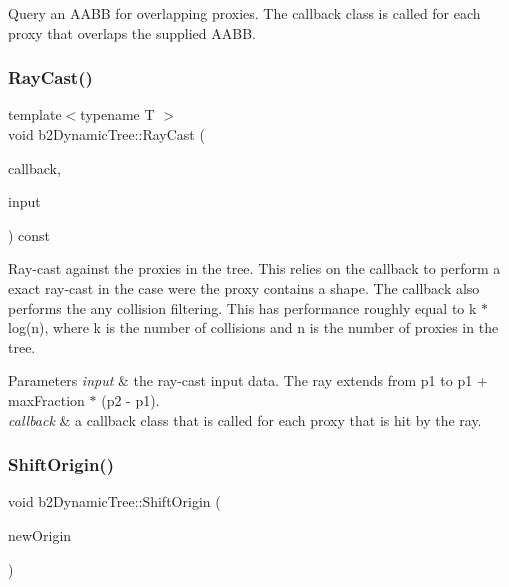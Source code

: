 Query an A\+A\+BB for overlapping proxies. The callback class is called for each proxy that overlaps the supplied A\+A\+BB. \mbox{\label{classb2DynamicTree_aebd2dc6ee462e0cd0763a5f472243a13}} 
\subsubsection{\texorpdfstring{Ray\+Cast()}{RayCast()}}
{\footnotesize\ttfamily template$<$typename T $>$ \\
void b2\+Dynamic\+Tree\+::\+Ray\+Cast (\begin{DoxyParamCaption}\item[{T $\ast$}]{callback,  }\item[{const \mbox{\hyperlink{structb2RayCastInput}{b2\+Ray\+Cast\+Input}} \&}]{input }\end{DoxyParamCaption}) const\hspace{0.3cm}{\ttfamily [inline]}}

Ray-\/cast against the proxies in the tree. This relies on the callback to perform a exact ray-\/cast in the case were the proxy contains a shape. The callback also performs the any collision filtering. This has performance roughly equal to k $\ast$ log(n), where k is the number of collisions and n is the number of proxies in the tree. 
\begin{DoxyParams}{Parameters}
{\em input} & the ray-\/cast input data. The ray extends from p1 to p1 + max\+Fraction $\ast$ (p2 -\/ p1). \\
\hline
{\em callback} & a callback class that is called for each proxy that is hit by the ray. \\
\hline
\end{DoxyParams}
\mbox{\label{classb2DynamicTree_af37ddfed6a5da97d5a78b09918d19ceb}} 
\subsubsection{\texorpdfstring{Shift\+Origin()}{ShiftOrigin()}}
{\footnotesize\ttfamily void b2\+Dynamic\+Tree\+::\+Shift\+Origin (\begin{DoxyParamCaption}\item[{const \mbox{\hyperlink{structb2Vec2}{b2\+Vec2}} \&}]{new\+Origin }\end{DoxyParamCaption})}

